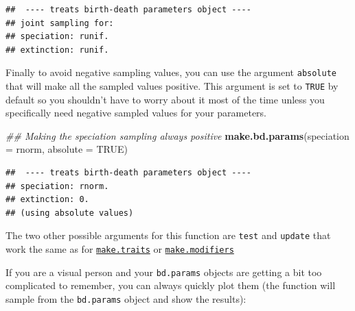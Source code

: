 \documentclass[
]{book}
\newenvironment{Shaded}{\begin{snugshade}}{\end{snugshade}}
\newcommand{\CommentTok}[1]{\textcolor[rgb]{0.56,0.35,0.01}{\textit{#1}}}
\newcommand{\DataTypeTok}[1]{\textcolor[rgb]{0.13,0.29,0.53}{#1}}
\newcommand{\KeywordTok}[1]{\textcolor[rgb]{0.13,0.29,0.53}{\textbf{#1}}}
\newcommand{\NormalTok}[1]{#1}
\newcommand{\OtherTok}[1]{\textcolor[rgb]{0.56,0.35,0.01}{#1}}
\begin{document}
\begin{verbatim}
##  ---- treats birth-death parameters object ---- 
## joint sampling for:
## speciation: runif.
## extinction: runif.
\end{verbatim}

Finally to avoid negative sampling values, you can use the argument \texttt{absolute} that will make all the sampled values positive.
This argument is set to \texttt{TRUE} by default so you shouldn't have to worry about it most of the time unless you specifically need negative sampled values for your parameters.

\begin{Shaded}
\begin{Highlighting}[]
\CommentTok{\#\# Making the speciation sampling always positive}
\KeywordTok{make.bd.params}\NormalTok{(}\DataTypeTok{speciation =}\NormalTok{ rnorm, }\DataTypeTok{absolute =} \OtherTok{TRUE}\NormalTok{)}
\end{Highlighting}
\end{Shaded}

\begin{verbatim}
##  ---- treats birth-death parameters object ---- 
## speciation: rnorm.
## extinction: 0.
## (using absolute values)
\end{verbatim}

The two other possible arguments for this function are \texttt{test} and \texttt{update} that work the same as for \protect\hyperlink{maketraits}{\texttt{make.traits}} or \protect\hyperlink{makemodifiers}{\texttt{make.modifiers}}

If you are a visual person and your \texttt{bd.params} objects are getting a bit too complicated to remember, you can always quickly plot them (the function will sample from the \texttt{bd.params} object and show the results):
\end{document}
